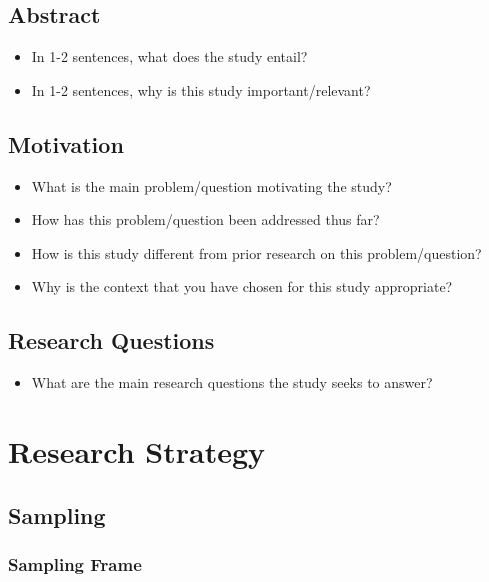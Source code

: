 \documentclass[
  letterpaper,
  DIV=11,
  numbers=noendperiod]{scrartcl}
\providecommand{\tightlist}{%
  \setlength{\itemsep}{0pt}\setlength{\parskip}{0pt}}\usepackage{longtable,booktabs,array}
\begin{document}
\subsection{Abstract}\label{abstract}

\begin{itemize}
\tightlist
\item
  In 1-2 sentences, what does the study entail?
\item
  In 1-2 sentences, why is this study important/relevant?
\end{itemize}

\subsection{Motivation}\label{motivation}

\begin{itemize}
\tightlist
\item
  What is the main problem/question motivating the study?
\item
  How has this problem/question been addressed thus far?
\item
  How is this study different from prior research on this
  problem/question?
\item
  Why is the context that you have chosen for this study appropriate?
\end{itemize}

\subsection{Research Questions}\label{research-questions}

\begin{itemize}
\tightlist
\item
  What are the main research questions the study seeks to answer?
\end{itemize}

\section{Research Strategy}\label{research-strategy}

\subsection{Sampling}\label{sampling}

\subsubsection{Sampling Frame}\label{sampling-frame}
\end{document}
